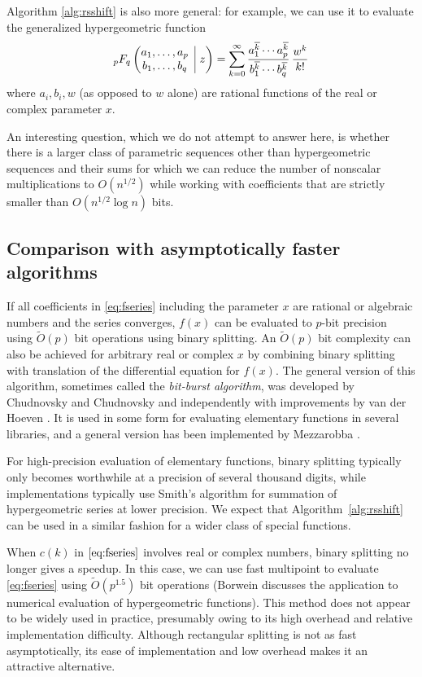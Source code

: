 \documentclass{sig-alternate}
\newcommand{\pFq}[2]{\ensuremath{\!\,_{#1}F_{#2}}}
\newcommand{\bigpFq}[5]{\ensuremath{\pFq{#1}{#2}\left(\begin{matrix}#3 \\ #4 \end{matrix} \;\; \vline  \;\; #5\right)}}
\newcommand   \OOsoft {\tilde O}
\begin{document}
Algorithm \ref{alg:rsshift} is also more general:
for example, we can use it to evaluate the
generalized hypergeometric function
\begin{equation}
\bigpFq{p}{q}{a_1, \ldots, a_p}{b_1, \ldots, b_q}{\!z} =
\sum_{k=0}^\infty
\frac{a_1^{\overline k} \cdots a_p^{\overline k}}{b_1^{\overline k} \cdots b_q^{\overline k}} \, \frac {w^k}{k!}
\end{equation}
where $a_i, b_i, w$ (as opposed to $w$ alone) are rational functions of
the real or complex parameter $x$.

An interesting question, which we do not attempt to answer here, is
whether there is a larger class of parametric sequences other than
hypergeometric sequences and their sums for which we can reduce
the number of nonscalar multiplications to $O(n^{1/2})$
while working with coefficients that are strictly smaller than
$O(n^{1/2} \log n)$ bits.

\subsection{Comparison with asymptotically faster \\ algorithms}

If all coefficients in \eqref{eq:fseries} including the parameter $x$
are rational or algebraic numbers and the series converges, $f(x)$ can be evaluated
to $p$-bit precision using $\tilde O(p)$ bit operations
using binary splitting. 
An $\tilde O(p)$ bit complexity can also
be achieved for arbitrary real or complex $x$ by combining
binary splitting with translation of the
differential equation for $f(x)$.
The general version of this algorithm, sometimes called the \emph{bit-burst algorithm},
was developed by Chudnovsky and Chudnovsky and independently
with improvements by van der Hoeven \cite{vdH:hol}. It is used
in some form
for evaluating elementary functions in several libraries,
and a general version has been implemented by Mezzarobba \cite{Mezzarobba2010}.

For high-precision evaluation of elementary functions, binary splitting typically only
becomes worthwhile at a precision of several thousand digits,
while implementations typically use Smith's algorithm for summation of hypergeometric series
at lower precision.
We expect that Algorithm~\ref{alg:rsshift} can be used
in a similar fashion for a wider class of special functions.

When $c(k)$ in $\eqref{eq:fseries}$ involves real or complex numbers,
binary splitting no longer gives a speedup. In this case,
we can use fast multipoint to evaluate \eqref{eq:fseries} using
$\OOsoft(p^{1.5})$ bit operations
(Borwein \cite{Borwein1987} discusses the application to numerical evaluation
of hypergeometric functions). This method does not appear to be
widely used in practice, presumably owing to its high overhead and relative
implementation difficulty. Although rectangular splitting is
not as fast asymptotically, its ease of implementation and low overhead
makes it an attractive alternative.
\end{document}
